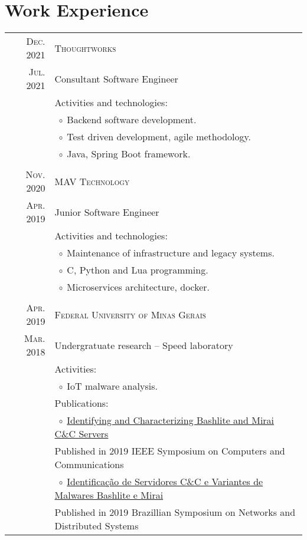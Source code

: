 \documentclass[a4paper,10pt]{article}
\newcommand{\tabitem}{$\;\circ\;$}
\newcommand{\cpp}{C\protect\scalebox{0.8}{\protect\raisebox{0.4ex}{++}}}
\renewcommand\#{\protect\scalebox{0.8}{\protect\raisebox{0.4ex}{\char"0023}}}
\begin{document}
\section{Work Experience}
\begin{tabular}{r|p{12.3cm}}
  \textsc{Dec. 2021} & \textsc{Thoughtworks} \\
  \textsc{Jul. 2021} & Consultant Software Engineer \\[5pt]
  & Activities and technologies: \\
  & \tabitem Backend software development. \\
  & \tabitem Test driven development, agile methodology. \\
  & \tabitem Java, Spring Boot framework. \\

  \multicolumn{2}{c}{} \\
  \textsc{Nov. 2020} & \textsc{MAV Technology} \\
  \textsc{Apr. 2019} & Junior Software Engineer \\[5pt]
  & Activities and technologies: \\
  & \tabitem Maintenance of infrastructure and legacy systems. \\
  & \tabitem \cpp, Python and Lua programming. \\
  & \tabitem Microservices architecture, docker. \\

  \multicolumn{2}{c}{} \\
  \textsc{Apr. 2019} & \textsc{Federal University of Minas Gerais} \\
  \textsc{Mar. 2018} & Undergratuate research -- Speed laboratory \\[5pt]
  & Activities: \\
  & \tabitem IoT malware analysis. \\
  & Publications: \\
  & \tabitem \href{https://doi.org/10.1109/ISCC47284.2019.8969728}{Identifying and Characterizing Bashlite and Mirai C\&C Servers} \\
  & \phantom{\tabitem}Published in 2019 IEEE Symposium on Computers and Communications \\
  & \tabitem \href{https://doi.org/10.5753/sbrc.2019.7398}{Identificação de Servidores C\&C e Variantes de Malwares Bashlite e Mirai} \\
  & \phantom{\tabitem}Published in 2019 Brazillian Symposium on Networks and Distributed Systems \\


\end{tabular}
\end{document}
